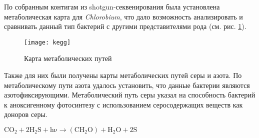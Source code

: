 По собранным контигам из shotgun-секвенирования была установлена метаболическая карта для \textit{Chlorobium}, что дало возможность анализировать и сравнивать данный тип бактерий с другими представителями рода (см. рис. \ref{img:kegg}). 

\begin{figure}[h]
  \texttt{[image: kegg]}
  \centering
  \caption{Карта метаболических путей}
  \label{img:kegg}  
\end{figure}

Также для них были получены карты метаболических путей серы и азота. По метаболическому пути азота удалось установить, что данные бактерии являются азотофиксирующими. Метаболический путь серы указал на способность бактерий к аноксигенному фотосинтезу с использованием серосодержащих веществ как доноров серы. 

\center $\mathrm{C O_2 + 2H_2 S + h\nu \xrightarrow{} (C H_2 O) + H_2 O + 2 S}$


\clearpage
